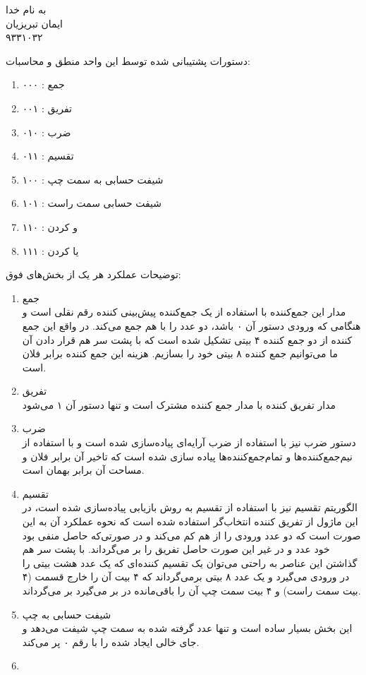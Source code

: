 \documentclass{article}[12pt]
\begin{document}
\begin{centering}
به نام خدا\\
ایمان تبریزیان\\
۹۳۳۱۰۳۲\\
\end{centering}


دستورات پشتیبانی شده توسط این واحد منطق و محاسبات:
\begin{enumerate}
\item ۰۰۰ : جمع
\item ۰۰۱ :‌ تفریق
\item ۰۱۰ : ضرب
\item ۰۱۱ : تقسیم
\item ۱۰۰ : شیفت حسابی به سمت چپ
\item ۱۰۱ : شیفت حسابی سمت راست
\item ۱۱۰ : و کردن
\item ۱۱۱ : یا کردن
\end{enumerate}
توضیحات عملکرد هر یک از بخش‌های فوق:\\
\begin{enumerate}
\item جمع\\
مدار این جمع‌کننده با استفاده از یک جمع‌کننده پیش‌بینی کننده رقم نقلی است و هنگامی که ورودی دستور آن ۰ باشد، دو عدد را با هم جمع می‌کند. در واقع این جمع کننده از دو جمع کننده ۴ بیتی تشکیل شده است که با پشت سر هم قرار دادن آن ما می‌توانیم جمع کننده ۸ بیتی خود را بسازیم. هزینه این جمع کننده برابر فلان است.
\item تفریق\\
مدار تفریق کننده با مدار جمع کننده مشترک است و تنها دستور آن ۱ می‌شود
\item ضرب\\
دستور ضرب نیز با استفاده از ضرب آرایه‌ای پیاده‌سازی شده است و با استفاده از نیم‌جمع‌کننده‌ها و تمام‌جمع‌کننده‌ها پیاده سازی شده است که تاخیر آن برابر فلان و مساحت آن برابر بهمان است.
\item تقسیم\\
الگوریتم تقسیم نیز با استفاده از تقسیم به روش بازیابی پیاده‌سازی شده است، در این ماژول از تفریق کننده انتخاب‌گر استفاده شده است که نحوه عملکرد آن به این صورت است که دو عدد ورودی را از هم کم می‌کند و در صورتی‌که حاصل منفی بود خود عدد و در غیر این صورت حاصل تفریق را بر می‌گرداند. با پشت سر هم گذاشتن این عناصر به راحتی می‌توان یک تقسیم کننده‌ای که یک عدد هشت بیتی را در ورودی می‌گیرد و یک عدد ۸ بیتی برمی‌گرداند که ۴ بیت آن را خارج قسمت (‌۴ بیت سمت راست) و ۴ بیت سمت چپ آن را باقی‌مانده در بر می‌گیرد بر می‌گرداند.
\item شیفت حسابی به چپ\\
این بخش بسیار ساده است و تنها عدد گرفته شده به سمت چپ شیفت می‌دهد و جای خالی ایجاد شده را با رقم ۰ پر می‌کند.
\item
\end{enumerate}
\end{document}
